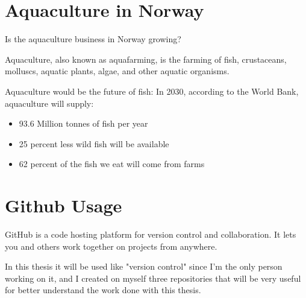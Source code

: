 \newpage

\section{Aquaculture in Norway}

Is the aquaculture business in Norway growing? 
  
Aquaculture, also known as aquafarming, is the farming of fish, crustaceans, molluscs, aquatic plants, algae, and other aquatic organisms.

Aquaculture would be the future of fish:
In 2030, according to the World Bank, aquaculture will supply:
\begin{itemize}
\item 93.6 Million tonnes of fish per year
\item 25 percent less wild fish will be available
\item 62 percent of the fish we eat will come from farms
\end{itemize}

\section{Github Usage}
GitHub is a code hosting platform for version control and collaboration. It lets you and others work together on projects from anywhere.

In this thesis it will be used like "version control" since I'm the only person working on it, and I created on myself three repositories that will be very useful for better understand the work done with this thesis.


